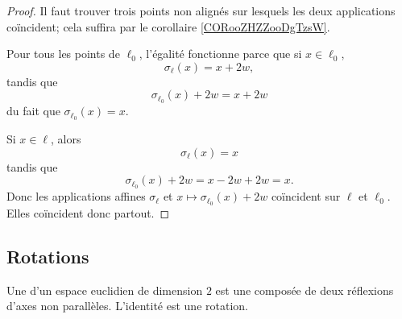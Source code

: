 \begin{proof}
    Il faut trouver trois points non alignés sur lesquels les deux applications coïncident; cela suffira par le corollaire \ref{CORooZHZZooDgTzsW}. 

    Pour tous les points de \( \ell_0\), l'égalité fonctionne parce que si \( x\in\ell_0\),
    \begin{equation}
        \sigma_{\ell}(x)=x+2w,
    \end{equation}
    tandis que
    \begin{equation}
        \sigma_{\ell_0}(x)+2w=x+2w
    \end{equation}
    du fait que \( \sigma_{\ell_0}(x)=x\).

    Si \( x\in\ell\), alors
    \begin{equation}
        \sigma_{\ell}(x)=x
    \end{equation}
    tandis que
    \begin{equation}
        \sigma_{\ell_0}(x)+2w=x-2w+2w=x.
    \end{equation}
    Donc les applications affines \( \sigma_{\ell}\) et \( x\mapsto \sigma_{\ell_0}(x)+2w\) coïncident sur \( \ell\) et \( \ell_0\). Elles coïncident donc partout.
\end{proof}

\subsection{Rotations}

\begin{definition}        \label{DEFooFUBYooHGXphm}
    Une  d'un espace euclidien de dimension \( 2\) est une composée de deux réflexions d'axes non parallèles. L'identité est une rotation.
\end{definition}

